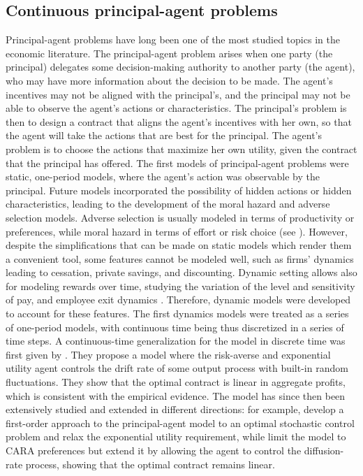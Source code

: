 \subsection{Continuous principal-agent problems} %
    Principal-agent problems have long been one of the most studied topics in the economic literature. The principal-agent problem arises when one party (the principal) delegates some decision-making authority to another party (the agent), who may have more information about the decision to be made. The agent's incentives may not be aligned with the principal's, and the principal may not be able to observe the agent's actions or characteristics. The principal's problem is then to design a contract that aligns the agent's incentives with her own, so that the agent will take the actions that are best for the principal. The agent's problem is to choose the actions that maximize her own utility, given the contract that the principal has offered. 
    The first models of principal-agent problems were static, one-period models, where the agent's action was observable by the principal. Future models incorporated the possibility of hidden actions or hidden characteristics, leading to the development of the moral hazard and adverse selection models. Adverse selection is usually modeled in terms of productivity or preferences, while moral hazard in terms of effort or risk choice (see \cite{cvitanic2017moral}). However, despite the simplifications that can be made on static models which render them a convenient tool, some features cannot be modeled well, such as firms' dynamics leading to cessation, private savings, and discounting. Dynamic setting allows also for modeling rewards over time, studying the variation of the level and sensitivity of pay, and employee exit dynamics \cite{edmans2017executive}. Therefore, dynamic models were developed to account for these features. The first dynamics models were treated as a series of one-period models, with continuous time being thus discretized in a series of time steps. A continuous-time generalization for the model in discrete time was first given by \cite{holmstrom1987aggregation}. They propose a model where the risk-averse and exponential utility agent controls the drift rate of some output process with built-in random fluctuations. They show that the optimal contract is linear in aggregate profits, which is consistent with the empirical evidence. The model has since then been extensively studied and extended in different directions: for example, \cite{schattler1993first} develop a first-order approach to the principal-agent model to an optimal stochastic control problem and relax the exponential utility requirement, while \cite{sung1995linearity} limit the model to CARA preferences but extend it by allowing the agent to control the diffusion-rate process, showing that the optimal contract remains linear.
